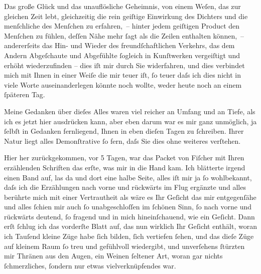 \pstart
           {\pb}Das große Glück und das unauflösliche Geheimnis, von
               einem Weſen, das zur gleichen Zeit lebt, gleichzeitig die rein geiſtige Einwirkung
               des Dichters und die menſchliche des Menſchen zu erfahren, – hinter jedem geiſtigen
               Product den Menſchen zu fühlen, deſſen Nähe mehr ſagt als die Zeilen enthalten
               können, – andererſeits das Hin- und Wieder des freundſchaftlichen Verkehrs, das dem
               Andern Abgeſchaute und Abgefühlte ſogleich in Kunſtwerken vergeiſtigt und erhöht
               wiederzufinden – dies iſt mir durch Sie widerfahren, und dies verbindet mich mit
               Ihnen in einer Weiſe die mir teuer iſt, ſo teuer daſs ich dies nicht in viele Worte
               auseinanderlegen könnte noch wollte, weder heute noch an einem ſpäteren Tag.\pend
           
\pstart
           Meine Gedanken über dieſes Alles waren viel reicher an Umfang und an Tiefe, als ich
               es jetzt hier ausdrücken kann, aber eben darum war es mir ganz {\pb}unmöglich, ja ſelbſt in Gedanken fernliegend, Ihnen in
               eben dieſen Tagen zu ſchreiben. Ihrer Natur liegt alles Demonſtrative ſo fern, daſs
               Sie dies ohne weiteres verſtehen.\pend
           
\pstart
           Hier her zurückgekommen, vor 5 Tagen, war das Packet von Fiſcher mit Ihren erzählenden
                  Schriften das erſte, was mir in die Hand kam. Ich blätterte irgend einen Band
               auf, las da und dort eine halbe Seite, alles iſt mir ja ſo wohlbekannt, daſs ich die
               Erzählungen nach vorne und rückwärts im Flug ergänzte und alles berührte mich mit
               einer Vertrautheit als wäre es Ihr Geſicht das mir entgegenſähe und alles ſchien mir
               auch ſo unabgeschloſſen im ſchönen Sinn, ſo nach vorne und rückwärts deutend, ſo
               fragend und in mich hineinſchauend, wie ein Geſicht. Dann erſt ſchlug ich das
               vorderſte Blatt auf, das nun wirklich Ihr Geſicht enthält, woran ich Tauſend kleine Züge habe ſich
               bilden, ſich vertiefen ſehen, und das dieſe Züge auf kleinem Raum ſo treu und
               gefühlvoll wiedergibt, und unverſehens ſtürzten mir {\pb}Thränen aus den Augen, ein Weinen ſeltener Art, woran gar nichts ſchmerzliches,
               ſondern nur etwas vielverknüpfendes war.\pend
           
